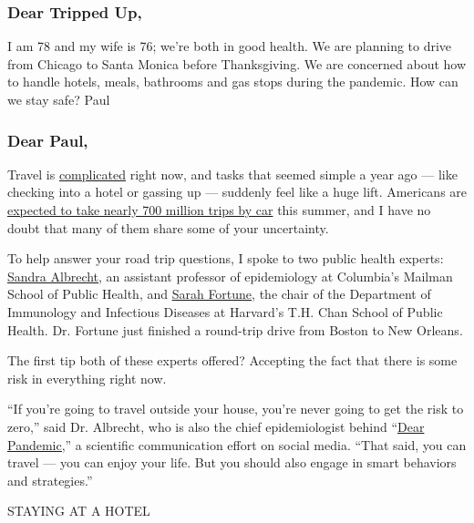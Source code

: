 \hypertarget{dear-tripped-up}{%
\subsubsection{Dear Tripped Up,}\label{dear-tripped-up}}

I am 78 and my wife is 76; we're both in good health. We are planning to
drive from Chicago to Santa Monica before Thanksgiving. We are concerned
about how to handle hotels, meals, bathrooms and gas stops during the
pandemic. How can we stay safe? Paul

\hypertarget{dear-paul}{%
\subsubsection{\texorpdfstring{\textbf{Dear
Paul,}}{Dear Paul,}}\label{dear-paul}}

Travel is
\href{https://www.nytimes3xbfgragh.onion/interactive/2020/07/31/travel/coronavirus-travel-risk.html}{complicated}
right now, and tasks that seemed simple a year ago --- like checking
into a hotel or gassing up --- suddenly feel like a huge lift. Americans
are
\href{https://newsroom.aaa.com/2020/06/aaa-forecasts-americans-will-take-700-million-trips-this-summer/}{expected
to take nearly 700 million trips by car} this summer, and I have no
doubt that many of them share some of your uncertainty.

To help answer your road trip questions, I spoke to two public health
experts:
\href{https://www.publichealth.columbia.edu/people/our-faculty/ssa2018}{Sandra
Albrecht}, an assistant professor of epidemiology at Columbia's Mailman
School of Public Health, and
\href{https://www.hsph.harvard.edu/sarah-fortune/}{Sarah Fortune}, the
chair of the Department of Immunology and Infectious Diseases at
Harvard's T.H. Chan School of Public Health. Dr. Fortune just finished a
round-trip drive from Boston to New Orleans.

The first tip both of these experts offered? Accepting the fact that
there is some risk in everything right now.

``If you're going to travel outside your house, you're never going to
get the risk to zero,'' said Dr. Albrecht, who is also the chief
epidemiologist behind
``\href{https://www.instagram.com/dear_pandemic/?hl=en}{Dear
Pandemic,}'' a scientific communication effort on social media. ``That
said, you can travel --- you can enjoy your life. But you should also
engage in smart behaviors and strategies.''

STAYING AT A HOTEL

